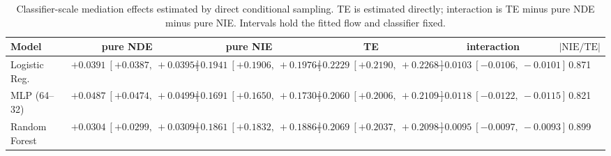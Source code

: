 \begin{table}[htbp]
  \centering
  \caption{Classifier-scale mediation effects estimated by direct conditional sampling. TE is estimated directly; interaction is TE minus pure NDE minus pure NIE. Intervals hold the fitted flow and classifier fixed.}
  \label{tab:german_synth_gap_overall}
  \begin{tabular}{lccccc}
    \toprule
    Model & pure NDE & pure NIE & TE & interaction & $|\mathrm{NIE}/\mathrm{TE}|$ \\
    \midrule
    Logistic Reg. & $+0.0391\ [+0.0387,\ +0.0395]$ & $+0.1941\ [+0.1906,\ +0.1976]$ & $+0.2229\ [+0.2190,\ +0.2268]$ & $-0.0103\ [-0.0106,\ -0.0101]$ & 0.871 \\
    MLP (64--32) & $+0.0487\ [+0.0474,\ +0.0499]$ & $+0.1691\ [+0.1650,\ +0.1730]$ & $+0.2060\ [+0.2006,\ +0.2109]$ & $-0.0118\ [-0.0122,\ -0.0115]$ & 0.821 \\
    Random Forest & $+0.0304\ [+0.0299,\ +0.0309]$ & $+0.1861\ [+0.1832,\ +0.1886]$ & $+0.2069\ [+0.2037,\ +0.2098]$ & $-0.0095\ [-0.0097,\ -0.0093]$ & 0.899 \\
    \bottomrule
  \end{tabular}
\end{table}